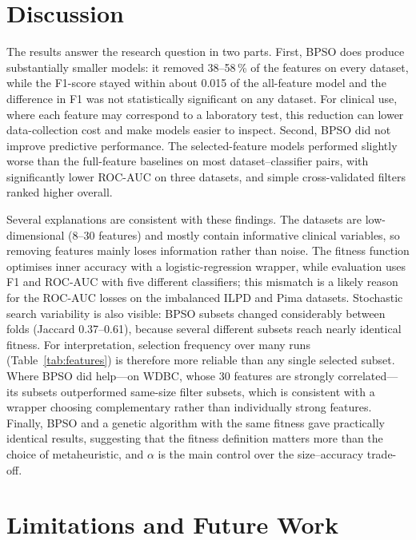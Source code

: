 \documentclass[conference]{IEEEtran}
\begin{document}
\section{Discussion}

The results answer the research question in two parts. First, BPSO does
produce substantially smaller models: it removed 38--58\,\% of the features
on every dataset, while the F1-score stayed within about 0.015 of the
all-feature model and the difference in F1 was not statistically significant
on any dataset. For clinical use, where each feature may correspond to a
laboratory test, this reduction can lower data-collection cost and make
models easier to inspect. Second, BPSO did not improve predictive performance.
The selected-feature models performed slightly worse than the full-feature
baselines on most dataset--classifier pairs, with significantly lower ROC-AUC
on three datasets, and simple cross-validated filters ranked higher overall.

Several explanations are consistent with these findings. The datasets are
low-dimensional (8--30 features) and mostly contain informative clinical
variables, so removing features mainly loses information rather than noise.
The fitness function optimises inner accuracy with a logistic-regression
wrapper, while evaluation uses F1 and ROC-AUC with five different classifiers;
this mismatch is a likely reason for the ROC-AUC losses on the imbalanced ILPD
and Pima datasets. Stochastic search variability is also visible: BPSO subsets
changed considerably between folds (Jaccard 0.37--0.61), because several
different subsets reach nearly identical fitness. For interpretation,
selection frequency over many runs (Table~\ref{tab:features}) is therefore
more reliable than any single selected subset. Where BPSO did help---on WDBC,
whose 30 features are strongly correlated---its subsets outperformed
same-size filter subsets, which is consistent with a wrapper choosing
complementary rather than individually strong features. Finally, BPSO and a
genetic algorithm with the same fitness gave practically identical results,
suggesting that the fitness definition matters more than the choice of
metaheuristic, and $\alpha$ is the main control over the size--accuracy
trade-off.

\section{Limitations and Future Work}
\end{document}
